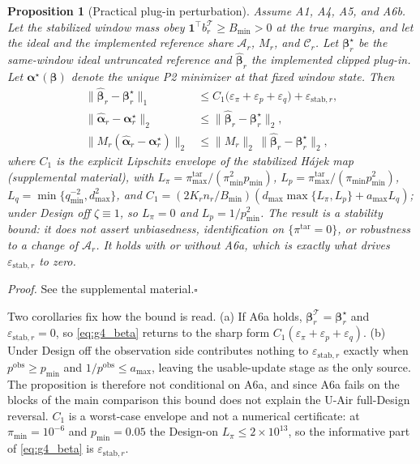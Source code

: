 \documentclass[letterpaper,journal]{IEEEtran}
\newtheorem{proposition}{Proposition}
\begin{document}
\begin{proposition}[Practical plug-in perturbation]
\label{prop:practical_plugin}
Assume A1, A4, A5, and A6b.  Let the stabilized window mass obey
$\mathbf{1}^{\top}b_r^{\mathcal T}\ge B_{\min}>0$ at the true margins, and let
the ideal and the implemented reference share $\mathcal{A}_r$, $M_r$, and
$\mathcal{C}_r$.  Let $\boldsymbol\beta_r^\star$ be the
same-window ideal untruncated reference and
$\widehat{\boldsymbol\beta}_r$ the implemented clipped plug-in.  Let
$\boldsymbol\alpha^\star(\boldsymbol\beta)$ denote the unique P2 minimizer
at that fixed window state.  Then
\begin{align}
\bigl\|\widehat{\boldsymbol\beta}_r-\boldsymbol\beta_r^\star\bigr\|_1
&\le
C_1\bigl(\varepsilon_\pi+\varepsilon_p+\varepsilon_q\bigr)
+\varepsilon_{\mathrm{stab},r},
\label{eq:g4_beta}\\
\bigl\|\widehat{\boldsymbol\alpha}_r-\boldsymbol\alpha_r^\star\bigr\|_2
&\le
\bigl\|\widehat{\boldsymbol\beta}_r-\boldsymbol\beta_r^\star\bigr\|_2,
\label{eq:g4_alpha}\\
\bigl\|M_r(\widehat{\boldsymbol\alpha}_r-\boldsymbol\alpha_r^\star)\bigr\|_2
&\le
\|M_r\|_2\,
\bigl\|\widehat{\boldsymbol\beta}_r-\boldsymbol\beta_r^\star\bigr\|_2,
\label{eq:g4_comp}
\end{align}
where $C_1$ is the explicit Lipschitz envelope of the stabilized H\'ajek map
(supplemental material), with
$L_\pi=\pi^{\mathrm{tar}}_{\max}/(\pi_{\min}^2p_{\min})$,
$L_p=\pi^{\mathrm{tar}}_{\max}/(\pi_{\min}p_{\min}^2)$,
$L_q=\min\{q_{\min}^{-2},d_{\max}^2\}$, and
$C_1=(2K_rn_r/B_{\min})(d_{\max}\max\{L_\pi,L_p\}+a_{\max}L_q)$; under Design
off $\zeta\equiv1$, so $L_\pi=0$ and $L_p=1/p_{\min}^2$.  The result is a
stability bound: it does not assert unbiasedness, identification on
$\{\pi^{\mathrm{tar}}=0\}$, or robustness to a change of $\mathcal{A}_r$.  It
holds with or without A6a, which is exactly what drives
$\varepsilon_{\mathrm{stab},r}$ to zero.
\end{proposition}

\noindent\emph{Proof.}
See the supplemental material.\hfill$\square$

Two corollaries fix how the bound is read.  (a) If A6a holds,
$\boldsymbol\beta_r^{\mathcal T}=\boldsymbol\beta_r^\star$ and
$\varepsilon_{\mathrm{stab},r}=0$, so \eqref{eq:g4_beta} returns to the sharp
form $C_1(\varepsilon_\pi+\varepsilon_p+\varepsilon_q)$.  (b) Under Design off
the observation side contributes nothing to $\varepsilon_{\mathrm{stab},r}$
exactly when $p^{\mathrm{obs}}\ge p_{\min}$ and
$1/p^{\mathrm{obs}}\le a_{\max}$, leaving the usable-update stage as the only
source.  The proposition is therefore not conditional on A6a, and since A6a
fails on the blocks of the main comparison this bound does not explain the
U-Air full-Design reversal.  $C_1$ is a worst-case envelope and not a numerical
certificate: at $\pi_{\min}=10^{-6}$ and $p_{\min}=0.05$ the Design-on
$L_\pi\le2\times10^{13}$, so the informative part of \eqref{eq:g4_beta} is
$\varepsilon_{\mathrm{stab},r}$.
\end{document}
